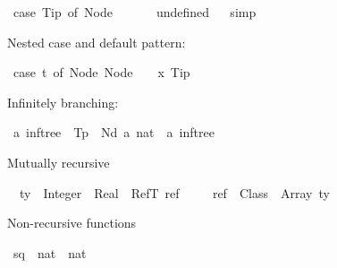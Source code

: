 \begin{isabellebody}
\begin{isamarkuptext}
\end{isamarkuptext}\isamarkuptrue%
\isamarkupfalse%
\ {\isachardoublequoteopen}{\isacharparenleft}{\kern0pt}case\ Tip\ of\ Node\ {\isacharunderscore}{\kern0pt}\ {\isacharunderscore}{\kern0pt}\ {\isacharunderscore}{\kern0pt}\ {\isacharequal}{\kern0pt}{\isachargreater}{\kern0pt}\ {}{\isacharparenright}{\kern0pt}\ {\isacharequal}{\kern0pt}\ undefined{\isachardoublequoteclose}%
\isadelimproof
\ %
\endisadelimproof
%
\isatagproof
{}\isamarkupfalse%
\ simp%
\endisatagproof
{\isafoldproof}%
%
\isadelimproof
%
\endisadelimproof
%
\begin{isamarkuptext}%
Nested case and default pattern:%
\end{isamarkuptext}\isamarkuptrue%
\isamarkupfalse%
\ {\isachardoublequoteopen}case\ t\ of\ Node\ {\isacharparenleft}{\kern0pt}Node\ {\isacharunderscore}{\kern0pt}\ {\isacharunderscore}{\kern0pt}\ {\isacharunderscore}{\kern0pt}{\isacharparenright}{\kern0pt}\ x\ Tip\ {\isacharequal}{\kern0pt}{\isachargreater}{\kern0pt}\ {}\ {\isacharbar}{\kern0pt}\ {\isacharunderscore}{\kern0pt}\ {\isacharequal}{\kern0pt}{\isachargreater}{\kern0pt}\ {}{\isachardoublequoteclose}%
\begin{isamarkuptext}%
Infinitely branching:%
\end{isamarkuptext}\isamarkuptrue%
\isamarkupfalse%
\ {\isacharprime}{\kern0pt}a\ inftree\ {\isacharequal}{\kern0pt}\ Tp\ {\isacharbar}{\kern0pt}\ Nd\ {\isacharprime}{\kern0pt}a\ {\isachardoublequoteopen}nat\ {\isasymRightarrow}\ {\isacharprime}{\kern0pt}a\ inftree{\isachardoublequoteclose}%
\begin{isamarkuptext}%
Mutually recursive%
\end{isamarkuptext}\isamarkuptrue%
\isamarkupfalse%
\isanewline
\ \ ty\ {\isacharequal}{\kern0pt}\ Integer\ {\isacharbar}{\kern0pt}\ Real\ {\isacharbar}{\kern0pt}\ RefT\ ref\isanewline
\ \ \isanewline
\ \ ref\ {\isacharequal}{\kern0pt}\ Class\ {\isacharbar}{\kern0pt}\ Array\ ty%
\isadelimdocument
%
\endisadelimdocument
%
\isatagdocument
%
\isamarkuptrue%
%
\endisatagdocument
{\isafolddocument}%
%
\isadelimdocument
%
\endisadelimdocument
%
\begin{isamarkuptext}%
Non-recursive functions%
\end{isamarkuptext}\isamarkuptrue%
\isamarkupfalse%
\ sq\ {\isacharcolon}{\kern0pt}{\isacharcolon}{\kern0pt}\ {\isachardoublequoteopen}nat\ {\isasymRightarrow}\ nat{\isachardoublequoteclose}\ \isanewline

\end{isabellebody}
